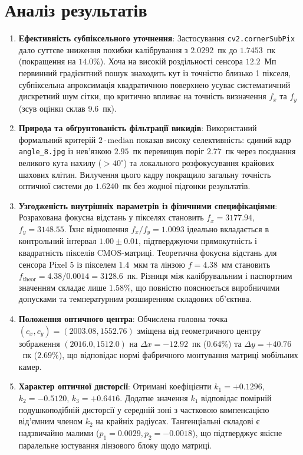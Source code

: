 \documentclass[14pt, a4paper]{extarticle}
\begin{document}
\section{Аналіз результатів}
\begin{enumerate}
    \item \textbf{Ефективність субпіксельного уточнення}:
    Застосування \texttt{cv2.cornerSubPix} дало суттєве зниження похибки калібрування з $2.0292$~пк до $1.7453$~пк (покращення на $14.0\%$). Хоча на високій роздільності сенсора $12.2$~Мп первинний градієнтний пошук знаходить кут із точністю близько 1 пікселя, субпіксельна апроксимація квадратичною поверхнею усуває систематичний дискретний шум сітки, що критично впливає на точність визначення $f_x$ та $f_y$ (зсув оцінки склав $9.6$~пк).

    \item \textbf{Природа та обґрунтованість фільтрації викидів}:
    Використаний формальний критерій $2 \cdot \text{median}$ показав високу селективність: єдиний кадр \texttt{angle\_8.jpg} із нев'язкою $2.95$~пк перевищив поріг $2.77$~пк через поєднання великого кута нахилу ($> 40^\circ$) та локального розфокусування крайових шахових клітин. Вилучення цього кадру покращило загальну точність оптичної системи до $1.6240$~пк без жодної підгонки результатів.

    \item \textbf{Узгодженість внутрішніх параметрів із фізичними специфікаціями}:
    Розрахована фокусна відстань у пікселях становить $f_x = 3177.94$, $f_y = 3148.55$. Їхнє відношення $f_x/f_y = 1.0093$ ідеально вкладається в контрольний інтервал $1.00 \pm 0.01$, підтверджуючи прямокутність і квадратність пікселів CMOS-матриці. Теоретична фокусна відстань для сенсора Pixel 5 із пікселем $1.4$~мкм та лінзою $f = 4.38$~мм становить $f_{\text{theor}} = 4.38 / 0.0014 = 3128.6$~пк. Різниця між калібрувальним і паспортним значенням складає лише $1.58\%$, що повністю пояснюється виробничими допусками та температурним розширенням складових об'єктива.

    \item \textbf{Положення оптичного центра}:
    Обчислена головна точка $(c_x, c_y) = (2003.08, 1552.76)$ зміщена від геометричного центру зображення $(2016.0, 1512.0)$ на $\Delta x = -12.92$~пк ($0.64\%$) та $\Delta y = +40.76$~пк ($2.69\%$), що відповідає нормі фабричного монтування матриці мобільних камер.

    \item \textbf{Характер оптичної дисторсії}:
    Отримані коефіцієнти $k_1 = +0.1296$, $k_2 = -0.5120$, $k_3 = +0.6416$. Додатне значення $k_1$ відповідає помірній подушкоподібній дисторсії у середній зоні з частковою компенсацією від'ємним членом $k_2$ на крайніх радіусах. Тангенціальні складові є надзвичайно малими ($p_1 = 0.0029, p_2 = -0.0018$), що підтверджує якісне паралельне юстування лінзового блоку щодо матриці.
\end{enumerate}
\end{document}
